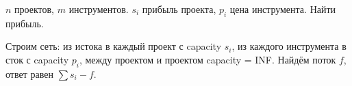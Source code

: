 $n$ проектов, $m$ инструментов.
$s_i$ прибыль проекта, $p_i$ цена инструмента. Найти прибыль. 

Строим сеть: 
из истока в каждый проект с capacity $s_i$,
из каждого инструмента в сток с capacity $p_i$, 
между проектом и проектом capacity = INF.
Найдём поток $f$, ответ равен $\sum s_i - f$.